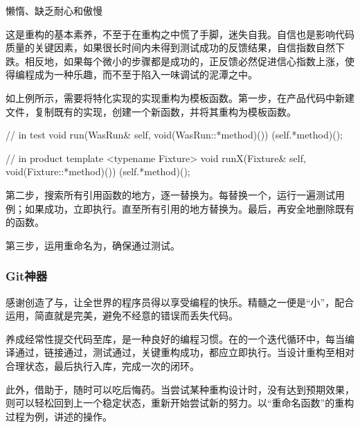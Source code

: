 \begin{content}
\begin{episode}{懒惰、缺乏耐心和傲慢}
\begin{content}
这是重构的基本素养，不至于在重构之中慌了手脚，迷失自我。自信也是影响代码质量的关键因素，如果很长时间内未得到测试成功的反馈结果，自信指数自然下跌。相反地，如果每个微小的步骤都是成功的，正反馈必然促进信心指数上涨，使得编程成为一种乐趣，而不至于陷入一味调试的泥潭之中。

如上例所示，需要将特化实现的实现重构为模板函数。第一步，在产品代码中新建文件，复制既有的实现，创建一个新函数，并将其重构为模板函数。

\begin{c++}[title={\ttfamily{重构: 搬迁实现}}]
// in test
void run(WasRun& self, void(WasRun::*method)()) {
  (self.*method)();
}

// in product
template <typename Fixture>
void runX(Fixture& self, void(Fixture::*method)()) {
  (self.*method)();
}
\end{c++}

第二步，搜索所有引用函数的地方，逐一替换为。每替换一个，运行一遍测试用例；如果成功，立即执行。直至所有引用的地方替换为。最后，再安全地删除既有的函数。

第三步，运用重命名为，确保通过测试。

\subsubsection{Git神器}

感谢创造了与，让全世界的程序员得以享受编程的快乐。精髓之一便是“小”，配合运用，简直就是完美，避免不经意的错误而丢失代码。

养成经常性提交代码至库，是一种良好的编程习惯。在的一个迭代循环中，每当编译通过，链接通过，测试通过，关键重构成功，都应立即执行。当设计重构至相对合理状态，最后执行入库，完成一次的闭环。

此外，借助于，随时可以吃后悔药。当尝试某种重构设计时，没有达到预期效果，则可以轻松回到上一个稳定状态，重新开始尝试新的努力。以“重命名函数”的重构过程为例，讲述的操作。

\begin{enum}
\end{enum}


\end{content}
\end{episode}
\end{content}
